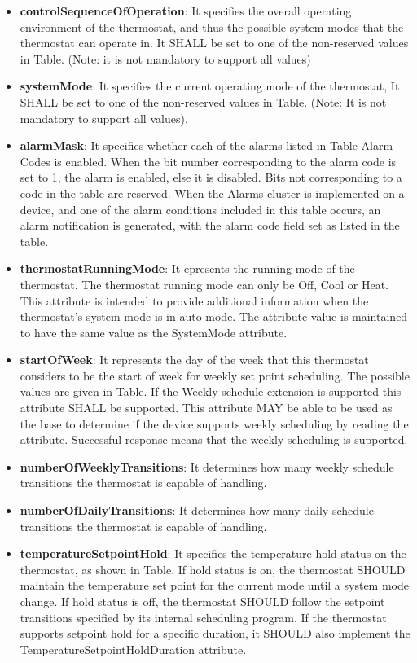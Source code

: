 \begin{itemize}
\item \textbf{controlSequenceOfOperation}:  It specifies the overall operating environment of the thermostat, and thus the possible system modes that the thermostat can operate in. It SHALL be set to one of the non-reserved values in Table. (Note: it is not mandatory to support all values)
\item \textbf{systemMode}:  It specifies the current operating mode of the thermostat, It SHALL be set to one of the non-reserved values in Table. (Note: It is not mandatory to support all values).
\item \textbf{alarmMask}: It specifies whether each of the alarms listed in Table Alarm Codes is enabled. When the bit number corresponding to the alarm code is set to 1, the alarm is enabled, else it is disabled. Bits not corresponding to a code in the table are reserved. When the Alarms cluster is implemented on a device, and one of the alarm conditions included in this table occurs, an alarm notification is generated, with the alarm code field set as listed in the table.
\item \textbf{thermostatRunningMode}: It epresents the running mode of the thermostat. The thermostat running mode can only be Off, Cool or Heat. This attribute is intended to provide additional information when the thermostat’s system mode is in auto mode. The attribute value is maintained to have the same value as the SystemMode attribute.
\item \textbf{startOfWeek}: It represents the day of the week that this thermostat considers to be the start of week for weekly set point scheduling. The possible values are given in Table. If the Weekly schedule extension is supported this attribute SHALL be supported. This attribute MAY be able to be used as the base to determine if the device supports weekly scheduling by reading the attribute. Successful response means that the weekly scheduling is supported.
\item \textbf{numberOfWeeklyTransitions}: It determines how many weekly schedule transitions the thermostat is capable of handling.	
\item \textbf{numberOfDailyTransitions}: It determines how many daily schedule transitions the thermostat is capable of handling.
\item \textbf{temperatureSetpointHold}: It specifies the temperature hold status on the thermostat, as shown in Table. If hold status is on, the thermostat SHOULD maintain the temperature set point for the current mode until a system mode change. If hold status is off, the thermostat SHOULD follow the setpoint transitions specified by its internal scheduling program. If the thermostat supports setpoint hold for a specific duration, it SHOULD also implement the TemperatureSetpointHoldDuration attribute.

\end{itemize}
